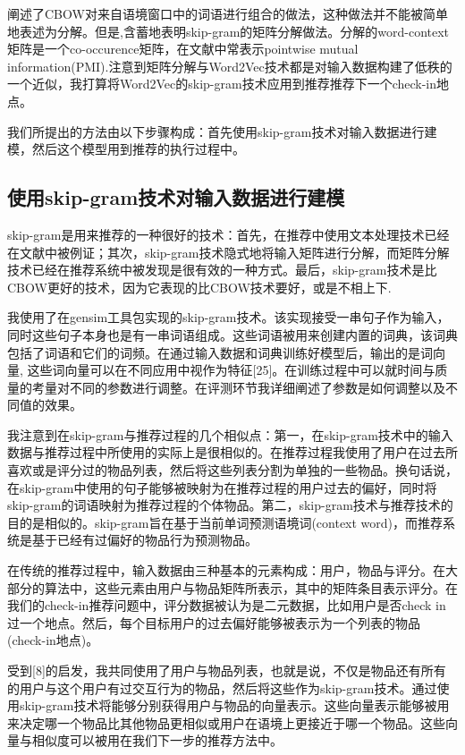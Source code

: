 \documentclass[UTF8]{ctexart}
\begin{document}
	\cite{levy2015improving}阐述了CBOW对来自语境窗口中的词语进行组合的做法，这种做法并不能被简单地表述为分解。但是,\cite{levy2014neural}含蓄地表明skip-gram的矩阵分解做法。分解的word-context矩阵是一个co-occurence矩阵，在文献中常表示pointwise mutual information(PMI).注意到矩阵分解与Word2Vec技术都是对输入数据构建了低秩的一个近似，我打算将Word2Vec的skip-gram技术应用到推荐推荐下一个check-in地点。
	
	我们所提出的方法由以下步骤构成：首先使用skip-gram技术对输入数据进行建模，然后这个模型用到推荐的执行过程中。
	
	\subsection{使用skip-gram技术对输入数据进行建模}
	skip-gram是用来推荐的一种很好的技术：首先，在推荐中使用文本处理技术已经在文献中被例证；其次，skip-gram技术隐式地将输入矩阵进行分解，而矩阵分解技术已经在推荐系统中被发现是很有效的一种方式。最后，skip-gram技术是比CBOW更好的技术，因为它表现的比CBOW技术要好，或是不相上下\cite{mikolov2013distributed,levy2014neural}.
	
	我使用了在gensim工具包实现的skip-gram技术。该实现接受一串句子作为输入，同时这些句子本身也是有一串词语组成。这些词语被用来创建内置的词典，该词典包括了词语和它们的词频。在通过输入数据和词典训练好模型后，输出的是词向量, 这些词向量可以在不同应用中视作为特征[25]。在训练过程中可以就时间与质量的考量对不同的参数进行调整。在评测环节我详细阐述了参数是如何调整以及不同值的效果。
	
	我注意到在skip-gram与推荐过程的几个相似点：第一，在skip-gram技术中的输入数据与推荐过程中所使用的实际上是很相似的。在推荐过程我使用了用户在过去所喜欢或是评分过的物品列表，然后将这些列表分割为单独的一些物品。换句话说，在skip-gram中使用的句子能够被映射为在推荐过程的用户过去的偏好，同时将skip-gram的词语映射为推荐过程的个体物品。第二，skip-gram技术与推荐技术的目的是相似的。skip-gram旨在基于当前单词预测语境词(context word)，而推荐系统是基于已经有过偏好的物品行为预测物品。
	
	在传统的推荐过程中，输入数据由三种基本的元素构成：用户，物品与评分。在大部分的算法中，这些元素由用户与物品矩阵所表示，其中的矩阵条目表示评分。在我们的check-in推荐问题中，评分数据被认为是二元数据，比如用户是否check in过一个地点。然后，每个目标用户的过去偏好能够被表示为一个列表的物品(check-in地点)。
	
	受到[8]的启发，我共同使用了用户与物品列表，也就是说，不仅是物品还有所有的用户与这个用户有过交互行为的物品，然后将这些作为skip-gram技术。通过使用skip-gram技术将能够分别获得用户与物品的向量表示。这些向量表示能够被用来决定哪一个物品比其他物品更相似或用户在语境上更接近于哪一个物品。这些向量与相似度可以被用在我们下一步的推荐方法中。
	
\end{document}
